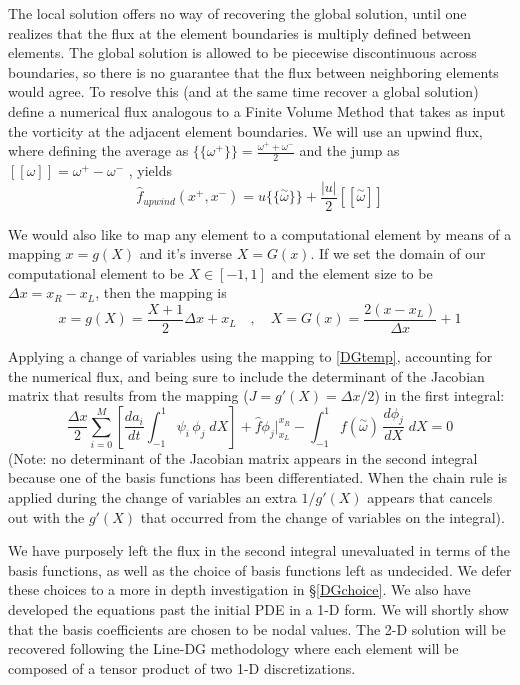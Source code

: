 \documentclass[letterpaper,12pt]{report}
\newcommand{\be}{\begin{equation}}
\newcommand{\ben}[1]{\begin{equation}\label{#1}}
\newcommand{\ee}{\end{equation}}
\newcommand{\aomega}{\overset{\sim}{\omega}}				%
\begin{document}
The local solution offers no way of recovering the global solution, until one realizes that the flux at the element boundaries is multiply defined between elements. The global solution is allowed to be piecewise discontinuous across boundaries, so there is no guarantee that the flux between neighboring elements would agree. To resolve this (and at the same time recover a global solution) define a numerical flux analogous to a Finite Volume Method that takes as input the vorticity at the adjacent element boundaries. We will use an upwind flux, where defining the average as $\{\!\{\omega^+\}\!\} = \frac{\omega^++\omega^-}{2}$ and the jump as $[[\omega]]=\omega^+-\omega^-$ \cite{HestWar}, yields
\be \hat{f}_{upwind}(x^+,x^-)=u\{\!\{\aomega\}\!\} + \frac{|u|}{2}[[\aomega]]\ee

We would also like to map any element to a computational element by means of a mapping $x=g(X)$ and it's inverse $X=G(x)$. If we set the domain of our computational element to be $X \in [-1, 1]$ and the element size to be $\Delta x = x_R - x_L$, then the mapping is
\be x=g(X)=\frac{X+1}{2}\Delta x + x_L\quad ,\quad X=G(x)=\frac{2(x-x_L)}{\Delta x}+1 \ee

Applying a change of variables using the mapping to \eqref{DGtemp}, accounting for the numerical flux, and being sure to include the determinant of the Jacobian matrix that results from the mapping ($J=g'(X)=\Delta x/2$) in the first integral:
\ben{DGtemp} \frac{\Delta x}{2}	\sum_{i=0}^M \left[ \frac{d a_i}{dt}	\int_{-1}^{1}\psi_i  \, \phi_j \;dX \right]
+\hat{f}\phi_j \Big|^{x_R}_{x_L} 
- \int_{-1}^{1} f(\aomega) \, \frac{d \phi_j}{dX} \;dX = 0 \ee
(Note: no determinant of the Jacobian matrix appears in the second integral because one of the basis functions has been differentiated. When the chain rule is applied during the change of variables an extra $1/g'(X)$ appears that cancels out with the $g'(X)$ that occurred from the change of variables on the integral).

We have purposely left the flux in the second integral unevaluated in terms of the basis functions, as well as the choice of basis functions left as undecided. We defer these choices to a more in depth investigation in \S \ref{DGchoice}. We also have developed the equations past the initial PDE in a 1-D form. We will shortly show that the basis coefficients are chosen to be nodal values. The 2-D solution will be recovered following the Line-DG methodology \cite{Persson2013} where each element will be composed of a tensor product of two 1-D discretizations.
\end{document}
